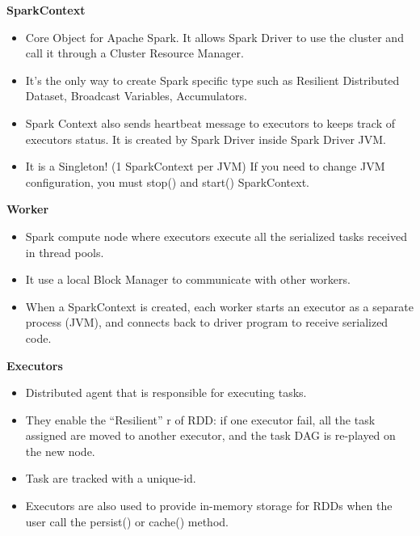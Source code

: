 \textbf{SparkContext}
\begin{itemize}
	\item Core Object for Apache Spark. It allows Spark Driver to use the cluster and call it through a Cluster Resource Manager.
	\item It’s the only way to create Spark specific type such as Resilient Distributed Dataset, Broadcast Variables, Accumulators.
	\item Spark Context also sends heartbeat message to executors to keeps track of executors status. It is created by Spark Driver inside Spark Driver JVM.
	\item It is a Singleton! (1 SparkContext per JVM) If you need to change JVM configuration, you must stop() and start() SparkContext.
\end{itemize}

\textbf{Worker}
\begin{itemize}
	\item Spark compute node where executors execute all the serialized tasks received in thread pools.
	\item It use a local Block Manager to communicate with other workers.
	\item When a SparkContext is created, each worker starts an executor as a separate process (JVM), and connects back to driver program to receive serialized code.
\end{itemize}

\textbf{Executors}
\begin{itemize}
	\item Distributed agent that is responsible for executing tasks.
	\item They enable the “Resilient” r of RDD: if one executor fail, all the task assigned are moved to another executor, and the task DAG is re-played on the new node.
	\item Task are tracked with a unique-id.
	\item Executors are also used to provide in-memory storage for RDDs when the user call the persist() or cache() method.
\end{itemize}

